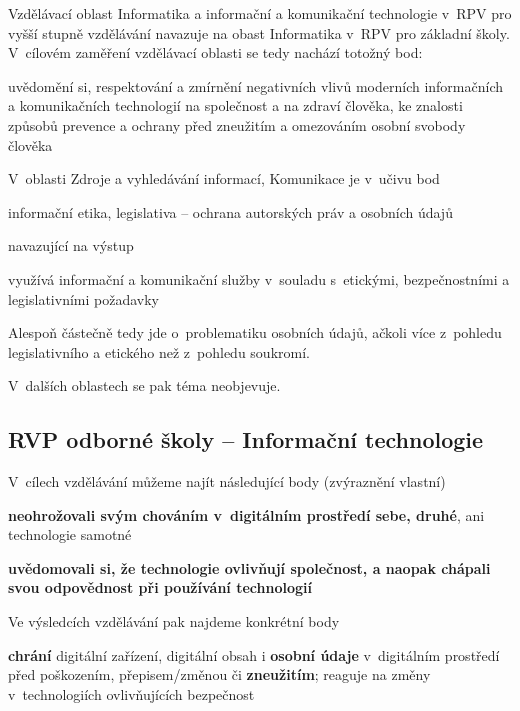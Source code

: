 Vzdělávací oblast Informatika a informační a komunikační technologie v~RPV pro vyšší stupně vzdělávání navazuje na obast Informatika v~RPV pro základní školy. V~cílovém zaměření vzdělávací oblasti se tedy nachází totožný bod:

\begin{displayquote}
uvědomění si, respektování a zmírnění negativních vlivů moderních informačních a komunikačních technologií na společnost a na zdraví člověka, ke znalosti způsobů prevence a ochrany před zneužitím a omezováním osobní svobody člověka
\end{displayquote}

V~oblasti Zdroje a vyhledávání informací, Komunikace je v~učivu bod

\begin{displayquote}informační etika, legislativa – ochrana autorských práv a osobních údajů
\end{displayquote}

navazující na výstup

\begin{displayquote}
využívá informační a komunikační služby v~souladu s~etickými, bezpečnostními a legislativními požadavky
\end{displayquote}

Alespoň částečně tedy jde o~problematiku osobních údajů, ačkoli více z~pohledu legislativního a etického než z~pohledu soukromí.

V~dalších oblastech se pak téma neobjevuje. 

\subsection{RVP odborné školy -- Informační technologie}

V~cílech vzdělávání můžeme najít následující body (zvýraznění vlastní)

\begin{displayquote}
\textbf{neohrožovali svým chováním v~digitálním prostředí sebe, druhé}, ani technologie samotné
\end{displayquote}

\begin{displayquote}
\textbf{uvědomovali si, že technologie ovlivňují společnost, a naopak chápali svou odpovědnost při používání technologií}
\end{displayquote}

Ve výsledcích vzdělávání pak najdeme konkrétní body

\begin{displayquote}
\textbf{chrání} digitální zařízení, digitální obsah i \textbf{osobní údaje} v~digitálním prostředí před poškozením, přepisem/změnou či \textbf{zneužitím}; reaguje na změny v~technologiích ovlivňujících bezpečnost
\end{displayquote}

